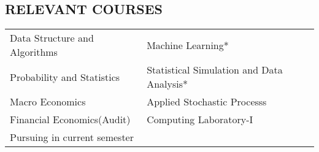 \documentclass[margin]{res}
\begin{document}
\begin{resume}
\section{RELEVANT COURSES}
\begin{tabular}{ l l }
 Data Structure and Algorithms & Machine Learning*\\ 
 Probability and Statistics & Statistical Simulation and Data Analysis*\\ 
    Macro Economics & Applied Stochastic Processs \\ 
   Financial Economics(Audit)
 & Computing Laboratory-I\\
  {\scriptsize * Pursuing in current semester}& \\
\end{tabular}


\end{resume}
\end{document}
